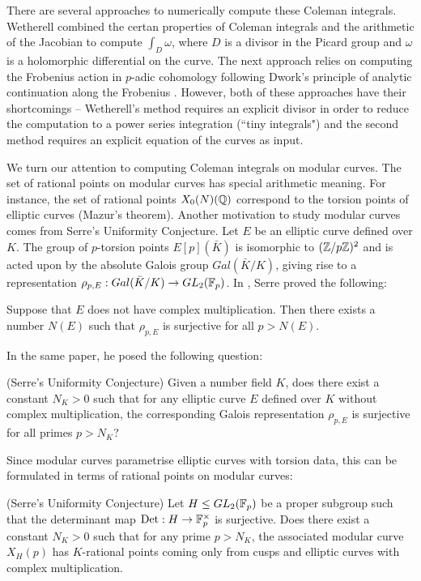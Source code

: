 There are several approaches to numerically compute these Coleman integrals. Wetherell \cite{wetherell} combined the certan properties of Coleman integrals and the arithmetic of the Jacobian to compute $\int_D \omega$, where $D$ is a divisor in the Picard group and $\omega$ is a holomorphic differential on the curve. The next approach relies on computing the Frobenius action in $p$-adic cohomology following Dwork's principle of analytic continuation along the Frobenius \cite{BBK10,Tui16,Tui17,BT_coleman}. However, both of these approaches have their shortcomings -- Wetherell's method requires an explicit divisor in order to reduce the computation to a power series integration (``tiny integrals") and the second method requires an explicit equation of the curves as input.

We turn our attention to computing Coleman integrals on modular curves. The set of rational points on modular curves has special arithmetic meaning. For instance, the set of rational points $X_0(N)(\mathbb{Q})$ correspond to the torsion points of elliptic curves (Mazur's theorem). Another motivation to study modular curves comes from Serre's Uniformity Conjecture. Let $E$ be an elliptic curve defined over $K$. The group of $p$-torsion points $E[p](\bar{K})$ is isomorphic to $(\mathbb{Z}/p\mathbb{Z})^2$ and is acted upon by the absolute Galois group $Gal(\bar{K}/K)$, giving rise to a representation $\rho_ {p,E}: Gal(\bar{K}/K) \rightarrow GL_2(\mathbb{F}_p)$. In \cite{serre72}, Serre proved the following:

\begin{theorem}
    Suppose that $E$ does not have complex multiplication. Then there exists a number $N(E)$ such that $\rho_{p,E}$ is surjective for all $p > N(E)$.
\end{theorem}

In the same paper, he posed the following question:

\begin{conj}{(Serre's Uniformity Conjecture)}
Given a number field $K$, does there exist a constant $N_K>0$ such that for any elliptic curve $E$ defined over $K$ without complex multiplication, the corresponding Galois representation $\rho_{p,E}$ is surjective for all primes $p > N_K$?
\end{conj}

Since modular curves parametrise elliptic curves with torsion data, this can be formulated in terms of rational points on modular curves:

\begin{conj}{(Serre's Uniformity Conjecture)}
    Let $H \leq GL_2(\mathbb{F}_p)$ be a proper subgroup such that the determinant map $\operatorname{Det}: H \rightarrow \mathbb{F}_p^\times$ is surjective. Does there exist a constant $N_K>0$ such that for any prime $p> N_K$, the associated modular curve $X_H(p)$ has $K$-rational points coming only from cusps and elliptic curves with complex multiplication.
\end{conj}




